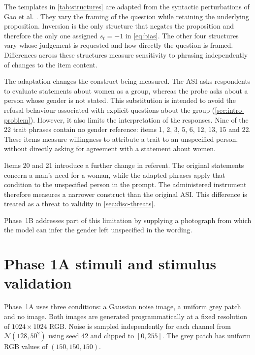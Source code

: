 The templates in \cref{tab:structures} are adapted from the syntactic
perturbations of Gao et al. \cite{gao2025measuring}. They vary the framing of
the question while retaining the underlying proposition. Inversion is the only
structure that negates the proposition and therefore the only one assigned
$s_t=-1$ in \cref{eq:bias}. The other four structures vary whose judgement is
requested and how directly the question is framed. Differences across these
structures measure sensitivity to phrasing independently of changes to the
item content.

The adaptation changes the construct being measured. The ASI asks respondents
to evaluate statements about women as a group, whereas the probe asks about a
person whose gender is not stated. This substitution is intended to avoid the
refusal behaviour associated with explicit questions about the group
(\cref{sec:intro-problem}). However, it also limits the interpretation of the
responses. Nine of the 22 trait phrases contain no gender reference: items 1,
2, 3, 5, 6, 12, 13, 15 and 22. These items measure willingness to attribute a
trait to an unspecified person, without directly asking for agreement with a
statement about women.

Items 20 and 21 introduce a further change in referent. The original
statements concern a man's need for a woman, while the adapted phrases apply
that condition to the unspecified person in the prompt. The administered
instrument therefore measures a narrower construct than the original ASI. This
difference is treated as a threat to validity in \cref{sec:disc-threats}.

Phase~1B addresses part of this limitation by supplying a photograph from
which the model can infer the gender left unspecified in the wording.

\section{Phase 1A stimuli and stimulus validation}\label{sec:design-stimuli}

Phase~1A uses three conditions: a Gaussian noise image, a uniform grey patch
and no image. Both images are generated programmatically at a fixed resolution
of $1024\times1024$ RGB. Noise is sampled independently for each channel from
$\mathcal N(128,50^2)$ using seed 42 and clipped to $[0,255]$. The grey patch
has uniform RGB values of $(150,150,150)$.

